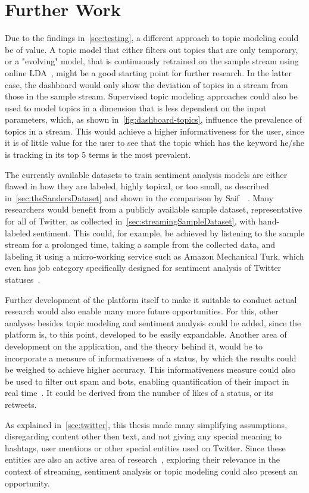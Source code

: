 \chapter{Further Work}
\label{ch:furtherWork}

Due to the findings in~\autoref{sec:testing},
a different approach to topic modeling could be of value.
A topic model that either filters out topics that are only temporary,
or a "evolving" model, that is continuously retrained on the sample stream using online LDA~\cite{hoffman2010online},
might be a good starting point for further research.
In the latter case, the dashboard would only show the deviation of topics in a stream from those in the sample stream.
Supervised topic modeling approaches could also be used to model topics in a dimension that is less dependent on the input parameters,
which, as shown in~\autoref{fig:dashboard-topics}, influence the prevalence of topics in a stream.
This would achieve a higher informativeness for the user, since it is of little value for the user to
see that the topic which has the keyword he/she is tracking in its top 5 terms is the most prevalent.

The currently available datasets to train sentiment analysis models are either flawed in how they are labeled, highly topical,
or too small, as described in~\autoref{sec:theSandersDataset} and shown in the comparison by Saif~\etAl~\cite{Saif2013}.
Many researchers would benefit from a publicly available sample dataset, representative for all of Twitter,
as collected in~\autoref{sec:streamingSampleDataset}, with hand-labeled sentiment.
This could, for example, be achieved by listening to the sample stream for a prolonged time,
taking a sample from the collected data, and labeling it using a micro-working service such as Amazon Mechanical Turk,
which even has job category specifically designed for sentiment analysis of Twitter statuses~\cite{mturk}.

Further development of the platform itself to make it suitable to conduct actual research
would also enable many more future opportunities.
For this, other analyses besides topic modeling and sentiment analysis could be added,
since the platform is, to this point, developed to be easily expandable.
Another area of development on the application, and the theory behind it,
would be to incorporate a measure of informativeness of a status,
by which the results could be weighed to achieve higher accuracy.
This informativeness measure could also be used to filter out spam and bots,
enabling quantification of their impact in real time~\cite{haustein2016tweets}.
It could be derived from the number of likes of a status, or its retweets.

As explained in~\autoref{sec:twitter}, this thesis made many simplifying assumptions, disregarding content other then text, and not giving any special meaning
to hashtags, user mentions or other special entities used on Twitter.
Since these entities are also an active area of research~\cite{page2012linguistics},
exploring their relevance in the context of streaming, sentiment analysis or topic modeling
could also present an opportunity.